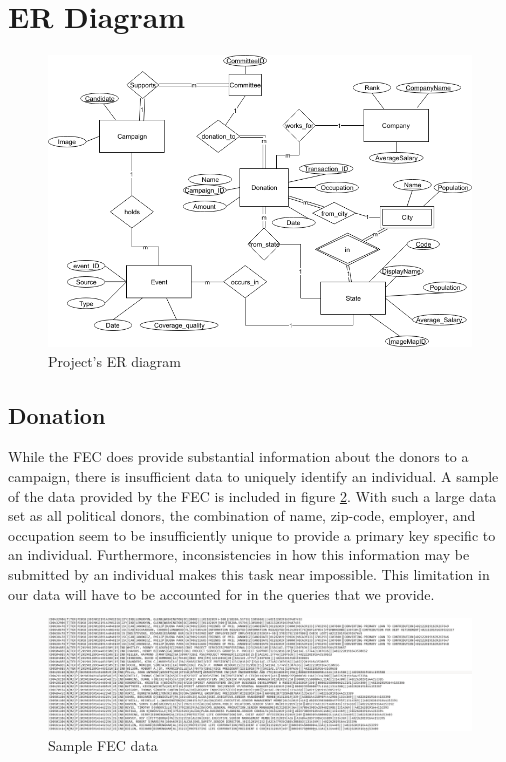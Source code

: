\documentclass[12pt]{article}
\begin{document}
\section{ER Diagram}
    \begin{figure}[H]
        \begin{center}
        \includegraphics[scale=.40]{projecter}
        \caption{Project's ER diagram}
        \label{fig:ER Diagram}
        \end{center}
    \end{figure}

    \subsection{Donation}
    While the FEC does provide substantial information about the donors to a campaign, there is insufficient data to uniquely identify an individual. A sample of the data provided by the FEC is included in figure \ref{fig:fecdata}. With such a large data set as all political donors, the combination of name, zip-code, employer, and occupation seem to be insufficiently unique to provide a primary key specific to an individual. Furthermore, inconsistencies in how this information may be submitted by an individual makes this task near impossible. This limitation in our data will have to be accounted for in the queries that we provide. 
        \begin{figure}[H]
            \begin{center}
            \includegraphics[scale=.30]{FECdata}
            \caption{Sample FEC data}
            \label{fig:fecdata}
            \end{center}
        \end{figure}
\end{document}
